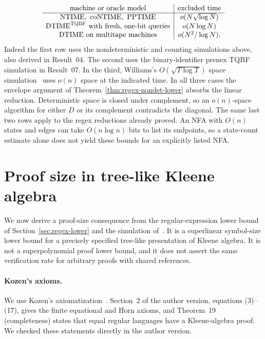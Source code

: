 \documentclass[11pt]{article}
\theoremstyle{definition}
\theoremstyle{remark}
\begin{document}
\[
\begin{array}{c|c}
 \text{machine or oracle model} & \text{excluded time}\\ \hline
 \mathrm{NTIME},\ \mathrm{coNTIME},\ \mathrm{PPTIME}
     & o(N\sqrt{\log N})\\
 \mathrm{DTIME}^{\textsc{TQBF}}\ \text{with fresh, one-bit queries}
     & o(N\log N)\\
 \mathrm{DTIME}\ \text{on multitape machines}
     & o(N^2/\log N).
\end{array}
\]
Indeed the first row uses the nondeterministic and counting simulations
above, also derived in Result~04. The second uses the binary-identifier
prenex TQBF simulation in Result~07. In the third, Williams's
$O(\sqrt{T\log T})$ space simulation~\cite{WilliamsSpace} uses $o(n)$
space at the indicated time. In all three cases the envelope argument
of Theorem~\ref{thm:regex-nondet-lower} absorbs the linear reduction.
Deterministic space is closed under complement, so an $o(n)$-space
algorithm for either $D$ or its complement contradicts the diagonal.
The same last two rows apply to the regex reductions already proved.
An NFA with $O(n)$ states and edges can take $O(n\log n)$ bits to list
its endpoints, so a state-count estimate alone does not yield these
bounds for an explicitly listed NFA.

\section{Proof size in tree-like Kleene algebra}
\label{sec:ka-proof-lower}

We now derive a proof-size consequence from the regular-expression
lower bound of Section~\ref{sec:regex-lower} and the simulation
of~\cite{Cruz26}. It is a superlinear symbol-size lower bound for a
precisely specified tree-like presentation of Kleene algebra. It is not
a superpolynomial proof lower bound, and it does not assert the same
verification rate for arbitrary proofs with shared references.

\paragraph{Kozen's axioms.}
We use Kozen's axiomatization~\cite{Kozen94}. Section~2 of the author
version, equations (3)--(17), gives the finite equational and Horn
axioms, and Theorem~19 (completeness) states that equal regular
languages have a Kleene-algebra proof. We checked these statements
directly in the author version.
\end{document}
